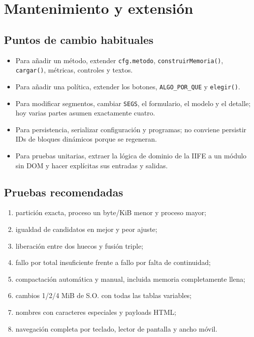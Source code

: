 \documentclass[11pt,a4paper]{article}
\newcommand{\funcion}[1]{\texttt{#1()}}
\begin{document}
\section{Mantenimiento y extensión}

\subsection{Puntos de cambio habituales}

\begin{itemize}
  \item Para añadir un método, extender \texttt{cfg.metodo},
  \funcion{construirMemoria}, \funcion{cargar}, métricas, controles y textos.
  \item Para añadir una política, extender los botones, \texttt{ALGO\_POR\_QUE} y
  \funcion{elegir}.
  \item Para modificar segmentos, cambiar \texttt{SEGS}, el formulario, el modelo
  y el detalle; hoy varias partes asumen exactamente cuatro.
  \item Para persistencia, serializar configuración y programas; no conviene
  persistir IDs de bloques dinámicos porque se regeneran.
  \item Para pruebas unitarias, extraer la lógica de dominio de la IIFE a un módulo
  sin DOM y hacer explícitas sus entradas y salidas.
\end{itemize}

\subsection{Pruebas recomendadas}

\begin{enumerate}
  \item partición exacta, proceso un byte/KiB menor y proceso mayor;
  \item igualdad de candidatos en mejor y peor ajuste;
  \item liberación entre dos huecos y fusión triple;
  \item fallo por total insuficiente frente a fallo por falta de continuidad;
  \item compactación automática y manual, incluida memoria completamente llena;
  \item cambios 1/2/4 MiB de S.O. con todas las tablas variables;
  \item nombres con caracteres especiales y payloads HTML;
  \item navegación completa por teclado, lector de pantalla y ancho móvil.
\end{enumerate}
\end{document}
